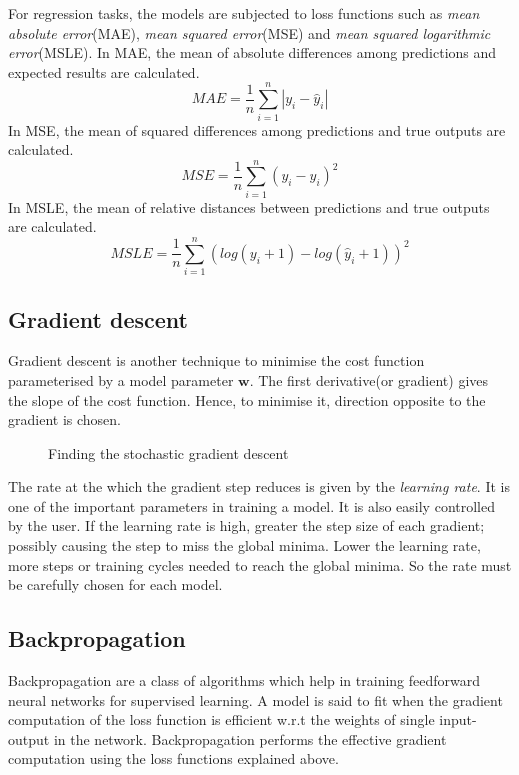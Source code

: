 For regression tasks, the models are subjected to loss functions such as \textit{mean
absolute error}(MAE), \textit{mean squared error}(MSE) and \textit{mean squared
logarithmic error}(MSLE). In MAE, the mean of absolute differences among predictions and
expected results are calculated.
\begin{equation}
    MAE = \frac{1}{n}\sum_{i=1}^n\left |y_i -\hat y_i \right|
   \label{eq:MAE}
\end{equation}
In MSE, the mean of squared differences among predictions and true outputs are
calculated.
\begin{equation}
    MSE = \frac{1}{n}\sum_{i=1}^n (y_i - \hat y_i)^2
    \label{eq:MSE}
\end{equation}
In MSLE, the mean of relative distances between predictions and true outputs are
calculated.
\begin{equation}
    MSLE = \frac{1}{n}\sum_{i=1}^n(log(y_i+1)-log(\hat y_i+1))^2
    \label{eq:MSLE}
\end{equation}

\subsection{Gradient descent}
\label{subsec:gradientdescent}
Gradient descent is another technique to minimise the cost function parameterised by a
model parameter $\mathbf{w}$. The first derivative(or gradient) gives the slope of the
cost function. Hence, to minimise it, direction opposite to the gradient is chosen.

\begin{figure}[h]
	\centering
    \def\svgwidth{0.5\textwidth}
        
    \caption{Finding the stochastic gradient descent}
    \label{fig:gradientdescent}
\end{figure}

The rate at the which the gradient step reduces is given by the \textit{learning rate}. It
is one of the important parameters in training a model. It is also easily controlled by
the user. If the learning rate is high, greater the step size of each gradient; possibly causing the
step to miss the global minima. Lower the learning rate, more steps or training cycles
needed to reach the global minima. So the rate must be carefully chosen for each model.

\subsection{Backpropagation}
\label{subsec:backpropagation}
Backpropagation are a class of algorithms which help in training feedforward neural
networks for supervised learning. A model is said to fit when the gradient computation of
the loss function is efficient w.r.t the weights of single input-output in the network.
Backpropagation performs the effective gradient computation using the loss functions
explained above.

